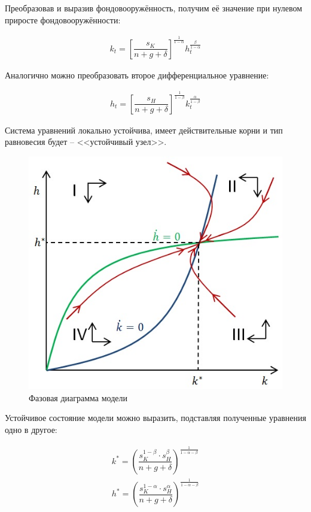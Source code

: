 \documentclass[14pt,fleqn]{extarticle}
\begin{document}
	Преобразовав и выразив фондовооружённость, получим её значение при нулевом приросте фондовооружённости:
	\begin{ceqn}
	\begin{align*}
	 	k_t = \left[\dfrac{s_K}{n + g + \delta}\right]^{\frac{1}{1-\alpha}} h_t^{\frac{\beta}{1-\alpha}}
	\end{align*}
	\end{ceqn}
	\newpage
	Аналогично можно преобразовать второе дифференциальное уравнение:
	\begin{ceqn}
		\begin{align*}
			h_t = \left[\dfrac{s_H}{n + g + \delta}\right]^{\frac{1}{1-\beta}} k_t^{\frac{\alpha}{1-\beta}}
		\end{align*}
	\end{ceqn}
	
	Система уравнений локально устойчива, имеет действительные корни и тип равновесия будет -- <<устойчивый узел>>.
	
	\begin{figure}[h]
		\centering \includegraphics[scale=0.6]{plot_M-R-W}
		\caption{Фазовая диаграмма модели}
		\label{fig:plot_M-R-W}
	\end{figure}
	
	Устойчивое состояние модели можно выразить, подставляя полученные уравнения одно в другое:
	\begin{ceqn}
		\begin{align*}
			k^* = \left(\dfrac{s_K^{1-\beta} \cdot s_H^\beta}{n + g + \delta}\right)^{\frac{1}{1-\alpha-\beta}}\\
			h^* = \left(\dfrac{s_K^{1-\alpha} \cdot s_H^\alpha}{n + g + \delta}\right)^{\frac{1}{1-\alpha-\beta}}
		\end{align*}
	\end{ceqn}
\end{document}
